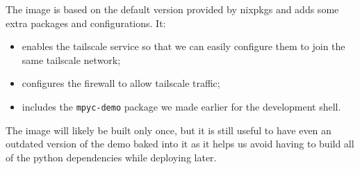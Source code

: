 \begin{Shaded}
\begin{Highlighting}[]

\OperatorTok{\{} \OperatorTok{,}   \OperatorTok{[} \OperatorTok{],}  \OperatorTok{\}}\NormalTok{:}
\OperatorTok{\{}
   \OperatorTok{=} \OperatorTok{[} \SpecialCharTok{$\{}\SpecialCharTok{\}} \OperatorTok{];}
   \OperatorTok{=} \OperatorTok{;}

   \OperatorTok{=} \OperatorTok{;} \OperatorTok{[}
  \OperatorTok{]} \OperatorTok{++}\OperatorTok{;}

   \OperatorTok{=} \OperatorTok{;}

   \OperatorTok{=} \OperatorTok{\{}
     \OperatorTok{=} \OperatorTok{;}
     \OperatorTok{=} \OperatorTok{;}
     \OperatorTok{=} \OperatorTok{[}  \OperatorTok{];}
  \OperatorTok{\};}
\OperatorTok{\}}
\end{Highlighting}
\end{Shaded}

The image is based on the default version provided by nixpkgs and adds
some extra packages and configurations. It:

\begin{itemize}
\tightlist
\item
  enables the tailscale service so that we can easily configure them to
  join the same tailscale network;
\item
  configures the firewall to allow tailscale traffic;
\item
  includes the \texttt{mpyc-demo} package we made earlier for the
  development shell.
\end{itemize}

The image will likely be built only once, but it is still useful to have
even an outdated version of the demo baked into it as it helps us avoid
having to build all of the python dependencies while deploying later.

